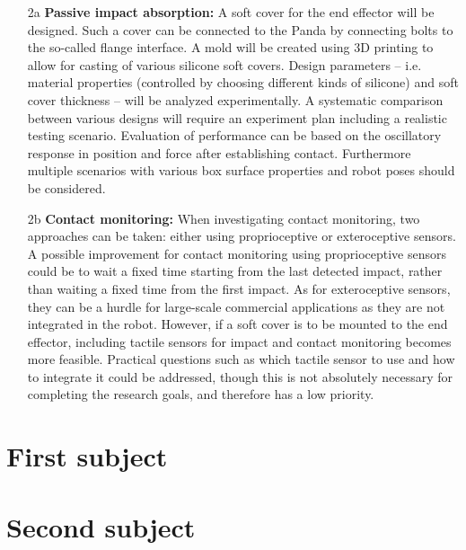 \documentclass[11pt]{report}
\numberwithin{equation}{section}        %
\numberwithin{figure}{section}          %
\numberwithin{table}{section}           %
\begin{document}
\begin{enumerate}
   \item[2a] \textbf{Passive impact absorption:} A soft cover for the end effector will be designed. Such a cover can be connected to the Panda by connecting bolts to the so-called flange interface. A mold will be created using 3D printing to allow for casting of various silicone soft covers. Design parameters -- i.e. material properties (controlled by choosing different kinds of silicone) and soft cover thickness -- will be analyzed experimentally. A systematic comparison between various designs will require an experiment plan including a realistic testing scenario. Evaluation of performance can be based on the oscillatory response in position and force after establishing contact. Furthermore multiple scenarios with various box surface properties and robot poses should be considered.
  
  \item[2b] \textbf{Contact monitoring:} When investigating contact monitoring, two approaches can be taken: either using proprioceptive or exteroceptive sensors. A possible improvement for contact monitoring using proprioceptive sensors could be to wait a fixed time starting from the last detected impact, rather than waiting a fixed time from the first impact. As for exteroceptive sensors, they can be a hurdle for large-scale commercial applications as they are not integrated in the robot. However, if a soft cover is to be mounted to the end effector, including tactile sensors for impact and contact monitoring becomes more feasible. Practical questions such as which tactile sensor to use and how to integrate it could be addressed, though this is not absolutely necessary for completing the research goals, and therefore has a low priority.
  \end{enumerate}
  \newpage
  \section{First subject}

  \section{Second subject}

  \newpage
  \printbibliography[title=References]

  \newpage
  \thispagestyle{empty} \ \newpage
\end{document}
